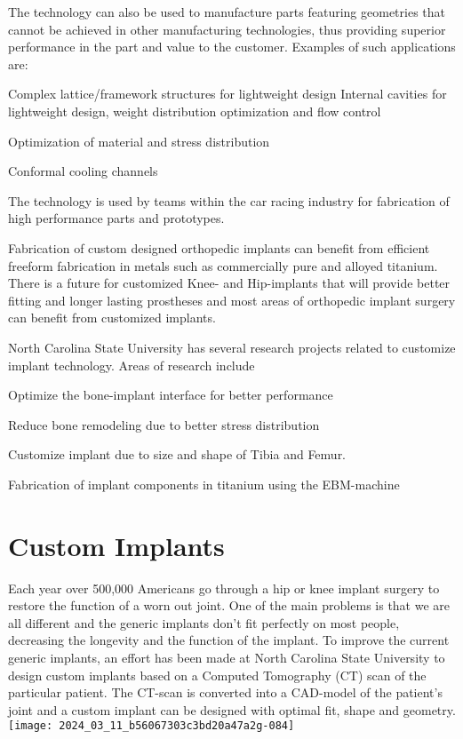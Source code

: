 \documentclass[10pt]{article}
\begin{document}
The technology can also be used to manufacture parts featuring geometries that cannot be achieved in other manufacturing technologies, thus providing superior\\
performance in the part and value to the customer. Examples of such applications are:

Complex lattice/framework structures for lightweight design Internal cavities for lightweight design, weight distribution optimization and flow control

Optimization of material and stress distribution

Conformal cooling channels

The technology is used by teams within the car racing industry for fabrication of high performance parts and prototypes.

Fabrication of custom designed orthopedic implants can benefit from efficient freeform fabrication in metals such as commercially pure and alloyed titanium. There is a future for customized Knee- and Hip-implants that will provide better fitting and longer lasting prostheses and most areas of orthopedic implant surgery can benefit from customized implants.

North Carolina State University has several research projects related to customize implant technology. Areas of research include

Optimize the bone-implant interface for better performance

Reduce bone remodeling due to better stress distribution

Customize implant due to size and shape of Tibia and Femur.

Fabrication of implant components in titanium using the EBM-machine

\section*{Custom Implants}
Each year over 500,000 Americans go through a hip or knee implant surgery to restore the function of a worn out joint. One of the main problems is that we are all different and the generic implants don't fit perfectly on most people, decreasing the longevity and the function of the implant. To improve the current generic implants, an effort has been made at North Carolina State University to design custom implants based on a Computed Tomography (CT) scan of the particular patient. The CT-scan is converted into a CAD-model of the patient's joint and a custom implant can be designed with optimal fit, shape and geometry.\\
\texttt{[image: 2024\_03\_11\_b56067303c3bd20a47a2g-084]}
\end{document}
